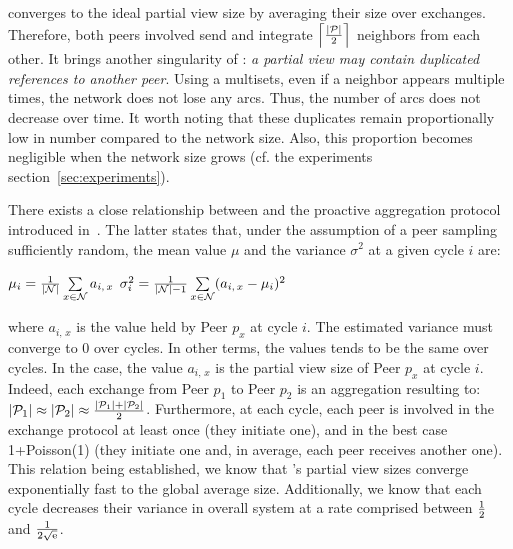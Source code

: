 \SCAMPLON{} converges to the ideal partial view size by averaging their size
over exchanges. Therefore, both peers involved send and integrate
$\left\lceil|\mathcal{P}|\over{2}\right\rceil$ neighbors from each other.  It
brings another singularity of \SCAMPLON{}: \emph{a partial view may contain
  duplicated references to another peer}. Using a multisets, even if a neighbor
appears multiple times, the network does not lose any arcs.  Thus, the number
of arcs does not decrease over time. It worth noting that these duplicates
remain proportionally low in number compared to the network size. Also, this
proportion becomes negligible when the network size grows (cf. the experiments
section~\ref{sec:experiments}). 

There exists a close relationship between \SCAMPLON{} and the proactive
aggregation protocol introduced
in~\cite{jelasity2004epidemic,montresor2004robust}. The latter states that,
under the assumption of a peer sampling sufficiently random, the mean value
$\mu$ and the variance $\sigma^2$ at a given cycle $i$ are:
\begin{center}
  $\mu_i = {1\over{|\mathcal{N}|}} \sum\limits_{x \in \mathcal{N}} a_{i,\,x}$
  \hfill
  $\sigma^2_i = {1\over{|\mathcal{N}|-1}}\sum\limits_{x \in \mathcal{N}}
  (a_{i,\,x} - \mu_i)^2$
\end{center}
where $a_{i,\,x}$ is the value held by Peer $p_x$ at cycle $i$. The estimated
variance must converge to $0$ over cycles. In other terms, the values tends to
be the same over cycles. In the \SCAMPLON{} case, the value $a_{i,\,x}$ is the
partial view size of Peer $p_x$ at cycle $i$. Indeed, each exchange from Peer
$p_1$ to Peer $p_2$ is an aggregation resulting to:
$|\mathcal{P}_1|\approx|\mathcal{P}_2|\approx{|\mathcal{P}_1| + |\mathcal{P}_2|
  \over{2}}$.
Furthermore, at each cycle, each peer is involved in the exchange protocol at
least once (they initiate one), and in the best case 1+Poisson(1) (they
initiate one and, in average, each peer receives another one). This relation
being established, we know that \SCAMPLON{}'s partial view sizes converge
exponentially fast to the global average size. Additionally, we know that each
cycle decreases their variance in overall system at a rate comprised between
${1\over{2}}$ and $1\over{2\sqrt{\text{e}}}$.

